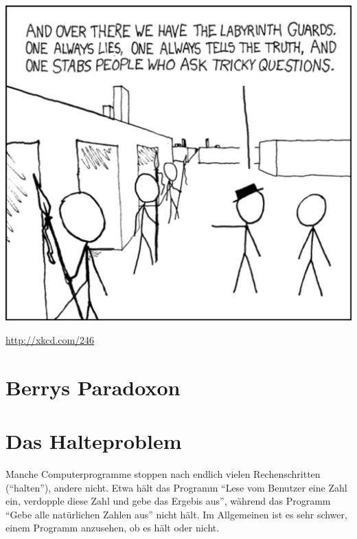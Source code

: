 \documentclass[twoside]{../zirkelblatt1415}
\theoremstyle{definition}
\theoremstyle{plain}
\theoremstyle{remark}
\begin{document}

\begin{center}
  \includegraphics[scale=1.1]{labyrinth_puzzle}

  {\small \url{http://xkcd.com/246}\par}
\end{center}

{\renewcommand\contentsname{}\renewcommand{\addvspace}[1]{\vskip0.6em}\vspace{-1.5em}
\tableofcontents%
}


\section{Berrys Paradoxon}


\section{Das Halteproblem}

Manche Computerprogramme stoppen nach endlich vielen Rechenschritten
("`halten"'), andere nicht. Etwa hält das Programm "`Lese vom Benutzer eine
Zahl ein, verdopple diese Zahl und gebe das Ergebis aus"', während das Programm
"`Gebe alle natürlichen Zahlen aus"' nicht hält. Im Allgemeinen ist es sehr
schwer, einem Programm anzusehen, ob es hält oder nicht.
\end{document}
